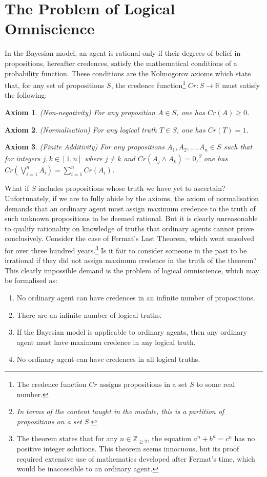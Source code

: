 \documentclass[12pt]{article}
\newtheorem{axiom}{Axiom}
\begin{document}
\section{The Problem of Logical Omniscience}
In the Bayesian model, an agent is rational only if their degrees of belief in propositions, hereafter credences, satisfy the mathematical conditions of a probability function.\autocite[13]{bdrc} These conditions are the Kolmogorov axioms which state that, for any set of propositions $S$, the credence function\footnote{The credence function $Cr$ assigns propositions in a set $S$ to some real number.} $Cr:S\rightarrow\mathbb{R}$ must satisfy the following:
\begin{axiom}
    (Non-negativity) For any proposition $A\in S$, one has $Cr(A)\geq0$.
\end{axiom}
\begin{axiom}
    (Normalisation) For any logical truth $T\in S$, one has $Cr(T)=1$.
\end{axiom}
\begin{axiom}
    (Finite Additivity) For any propositions $A_1, A_2,\dots, A_n\in S$ such that for integers $j,k\in[1,n]$ where $j\neq k$ and $Cr(A_j\land A_k)=0$,\footnote{In terms of the content taught in the module, this is a partition of propositions on a set $S$.} one has $Cr(\bigvee_{i=1}^{n}A_i)=\sum_{i=1}^{n}Cr(A_i)$.
\end{axiom}
What if $S$ includes propositions whose truth we have yet to ascertain? Unfortunately, if we are to fully abide by the axioms, the axiom of normalisation demands that an ordinary agent must assign maximum credence to the truth of such unknown propositions to be deemed rational. But it is clearly unreasonable to qualify rationality on knowledge of truths that ordinary agents cannot prove conclusively. Consider the case of Fermat's Last Theorem, which went unsolved for over three hundred years.\footnote{The theorem states that for any $n\in\mathbb{Z}_{\geq2}$, the equation $a^n+b^n=c^n$ has no positive integer solutions. This theorem seems innocuous, but its proof required extensive use of mathematics developed after Fermat's time, which would be inaccessible to an ordinary agent.} Is it fair to consider someone in the past to be irrational if they did not assign maximum credence in the truth of the theorem?\autocite[108]{dogramaci} This clearly impossible demand is the problem of logical omniscience, which may be formalised as:\autocite{youtube}
\begin{enumerate}[label=\textbf{P\arabic*:},leftmargin=0.5in]
    \item No ordinary agent can have credences in an infinite number of propositions.
    \item There are an infinite number of logical truths.
    \item If the Bayesian model is applicable to ordinary agents, then any ordinary agent must have maximum credence in any logical truth.
    \item No ordinary agent can have credences in all logical truths.
\end{enumerate}
\end{document}
